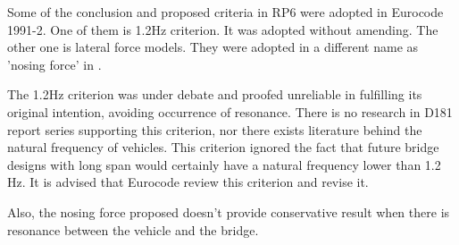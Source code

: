 Some of the conclusion and proposed criteria in RP6 were adopted in Eurocode 1991-2. One of them is 1.2Hz criterion. It was adopted without amending. The other one is lateral force models. They were adopted in a different name as 'nosing force' in \citet[A6.5.2]{EC12}. 

The 1.2Hz criterion was under debate and proofed unreliable in fulfilling its original intention, avoiding occurrence of resonance. There is no research in D181 report series supporting this criterion, nor there exists literature behind the natural frequency of vehicles. This criterion ignored the fact that future bridge designs with long span would certainly have a natural frequency lower than 1.2 Hz. It is advised that Eurocode review this criterion and revise it.

Also, the nosing force proposed doesn't provide conservative result when there is resonance between the vehicle and the bridge.
